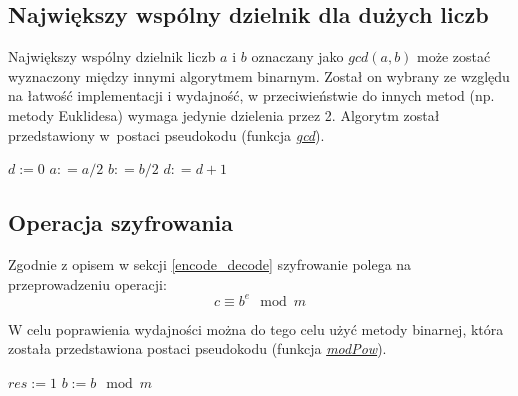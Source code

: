 \documentclass[10pt,a4paper]{article}
\begin{document}
\subsection{Największy wspólny dzielnik dla dużych liczb}
Największy wspólny dzielnik liczb $a$ i $b$ oznaczany jako $gcd(a,b)$ może zostać wyznaczony między innymi algorytmem binarnym. Został on wybrany ze względu na łatwość implementacji i wydajność, w przeciwieństwie do innych metod (np. metody Euklidesa) wymaga jedynie dzielenia przez 2. Algorytm został przedstawiony w~postaci pseudokodu (funkcja \hyperref[fun_gcd]{\textit{gcd}}).

\begin{algorithm} \label{fun_gcd}
\begin{algorithmic}[1]
\State $d := 0$
	\State $a : =a/2$
	\State $b : =b/2$
	\State $d : = d + 1$
\EndWhile

	   
	   
	  
	 \Else {}
	 \EndIf
\EndWhile

\State {}
\EndFunction
\end{algorithmic}
\end{algorithm}


\subsection{Operacja szyfrowania}

Zgodnie z opisem w sekcji \ref{encode_decode} szyfrowanie polega na przeprowadzeniu operacji:
\begin{equation}
c \equiv b^e \mod m
\end{equation}

W celu poprawienia wydajności można do tego celu użyć metody binarnej, która została przedstawiona postaci pseudokodu (funkcja \hyperref[fun_modPow]{\textit{modPow}}).


\begin{algorithm} \label{fun_modPow}
\begin{algorithmic}[1]
\EndIf

\State $res := 1$
\State $b := b \mod m$
	\EndIf
\EndWhile

\State {}
\EndFunction
\end{algorithmic}
\end{algorithm}
\end{document}
